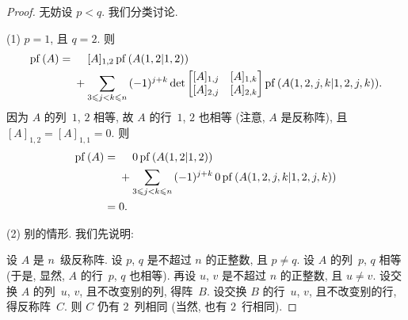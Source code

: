 \documentclass[../libro.tex]{subfiles}
\begin{document}
\begin{proof}
    无妨设 \(p < q\).
    我们分类讨论.

    (1)
    \(p = 1\), 且 \(q = 2\).
    则
    \begin{align*}
        \operatorname{pf} {(A)}
        = {} &
        \hphantom{{} + {}}
        [A]_{1,2}
        \operatorname{pf} {(A({1,2}|{1,2}))}
        \\
        &
        +
        \sum_{3 \leq j < k \leq n}
        {
            (-1)^{j + k}
            \det {
                \begin{bmatrix}
                    [A]_{1,j} & [A]_{1,k} \\
                    [A]_{2,j} & [A]_{2,k} \\
                \end{bmatrix}
            }
            \operatorname{pf} {(A({1,2,j,k}|{1,2,j,k}))}
        }.
    \end{align*}
    因为 \(A\) 的列~\(1\), \(2\) 相等,
    故 \(A\) 的行~\(1\), \(2\) 也相等
    (注意, \(A\) 是反称阵),
    且 \([A]_{1,2} = [A]_{1,1} = 0\).
    则
    \begin{align*}
        \operatorname{pf} {(A)}
        = {} &
        \hphantom{{} + {}}
        0
        \operatorname{pf} {(A({1,2}|{1,2}))}
        \\
        &
        +
        \sum_{3 \leq j < k \leq n}
        {
            (-1)^{j + k}
            \,
            0
            \operatorname{pf} {(A({1,2,j,k}|{1,2,j,k}))}
        }
        \\
        = {} &
        0.
    \end{align*}

    (2)
    别的情形.
    我们先说明:

    设 \(A\) 是 \(n\)~级反称阵.
    设 \(p\), \(q\) 是不超过 \(n\) 的正整数, 且 \(p \neq q\).
    设 \(A\) 的列~\(p\), \(q\) 相等
    (于是, 显然, \(A\) 的行~\(p\), \(q\) 也相等).
    再设 \(u\), \(v\) 是不超过 \(n\) 的正整数, 且 \(u \neq v\).
    设交换 \(A\) 的列~\(u\), \(v\), 且不改变别的列, 得阵~\(B\).
    设交换 \(B\) 的行~\(u\), \(v\), 且不改变别的行,
    得反称阵~\(C\).
    则 \(C\) 仍有 \(2\)~列相同 (当然, 也有 \(2\)~行相同).


\end{proof}
\end{document}
